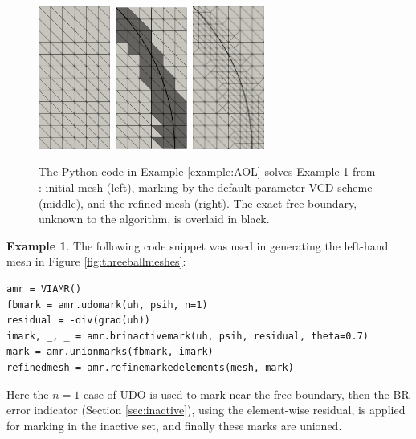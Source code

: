 \documentclass[]{interact}
\theoremstyle{plain}%
\theoremstyle{definition}
\newtheorem{example}[theorem]{Example}
\theoremstyle{remark}
\begin{document}
\begin{figure}[ht]
\centering
\mbox{\includegraphics[width=0.21\textwidth]{static/aol-mesh.png} \qquad\quad
\includegraphics[width=0.21\textwidth]{static/aol-marked.png} \qquad\quad
\includegraphics[width=0.21\textwidth]{static/aol-refinedmesh.png}}
\caption{The Python code in Example \ref{example:AOL} solves Example 1 from \cite{AinsworthOdenLee1993}: initial mesh (left), marking by the default-parameter VCD scheme (middle), and the refined mesh (right).  The exact free boundary, unknown to the algorithm, is overlaid in black.}
\label{fig:resultAOL}
\end{figure}

\begin{example} \label{example:hybrid}
The following code snippet was used in generating the left-hand mesh in Figure \ref{fig:threeballmeshes}:
\begin{verbatim}
amr = VIAMR()
fbmark = amr.udomark(uh, psih, n=1)
residual = -div(grad(uh))
imark, _, _ = amr.brinactivemark(uh, psih, residual, theta=0.7)
mark = amr.unionmarks(fbmark, imark)
refinedmesh = amr.refinemarkedelements(mesh, mark)
\end{verbatim}
Here the $n=1$ case of UDO is used to mark near the free boundary, then the BR error indicator (Section \ref{sec:inactive}), using the element-wise residual, is applied for marking in the inactive set, and finally these marks are unioned.
\end{example}
\end{document}
